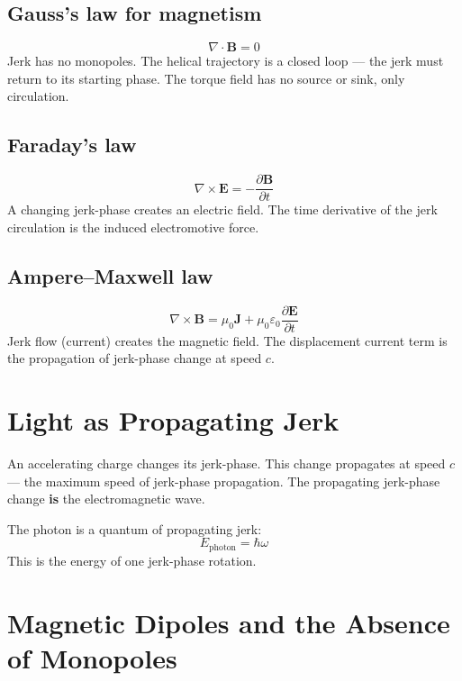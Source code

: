 \documentclass[11pt,letterpaper]{article}
\begin{document}
\subsection{Gauss's law for magnetism}
\begin{equation}
  \nabla \cdot \mathbf{B} = 0
  \label{eq:gauss_b}
\end{equation}
Jerk has no monopoles. The helical trajectory is a closed loop --- the jerk
must return to its starting phase. The torque field has no source or sink,
only circulation.

\subsection{Faraday's law}
\begin{equation}
  \nabla \times \mathbf{E} = -\frac{\partial \mathbf{B}}{\partial t}
  \label{eq:faraday}
\end{equation}
A changing jerk-phase creates an electric field. The time derivative of the
jerk circulation is the induced electromotive force.

\subsection{Ampere--Maxwell law}
\begin{equation}
  \nabla \times \mathbf{B} = \mu_0 \mathbf{J} + \mu_0 \varepsilon_0 \frac{\partial \mathbf{E}}{\partial t}
  \label{eq:ampere}
\end{equation}
Jerk flow (current) creates the magnetic field. The displacement current term
is the propagation of jerk-phase change at speed $c$.

\section{Light as Propagating Jerk}

An accelerating charge changes its jerk-phase. This change propagates at speed
$c$ --- the maximum speed of jerk-phase propagation. The propagating jerk-phase
change \textbf{is} the electromagnetic wave.

The photon is a quantum of propagating jerk:
\begin{equation}
  E_{\mathrm{photon}} = \hbar \omega
  \label{eq:photon}
\end{equation}
This is the energy of one jerk-phase rotation.

\section{Magnetic Dipoles and the Absence of Monopoles}
\end{document}
